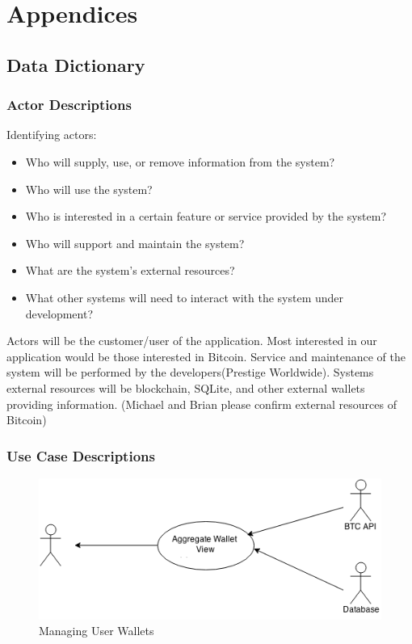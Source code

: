 \renewcommand\thefigure{\thesection.\arabic{figure}}   

\clearpage
\section{Appendices}
  \subsection{Data Dictionary}
    \subsubsection{Actor Descriptions}

    
Identifying actors:\\
\begin{itemize}
  \item Who will supply, use, or remove information from the system?
  \item Who will use the system?
  \item Who is interested in a certain feature or service provided by the system?
  \item Who will support and maintain the system?
  \item What are the system's external resources?
  \item What other systems will need to interact with the system under development?
\end{itemize}

Actors will be the customer/user of the application.  Most interested in our application would be those interested in Bitcoin. Service and maintenance of the system will be performed by the developers(Prestige Worldwide). Systems external resources will be blockchain, SQLite, and other external wallets providing information. (Michael and Brian please confirm external resources of Bitcoin)
\clearpage
  \subsubsection{Use Case Descriptions}

  

  \begin{figure}[H]
    \centering
    \includegraphics[scale=0.6]{../diagrams/usecase_3_5.png}
    \caption{Managing User Wallets}
  \end{figure}

